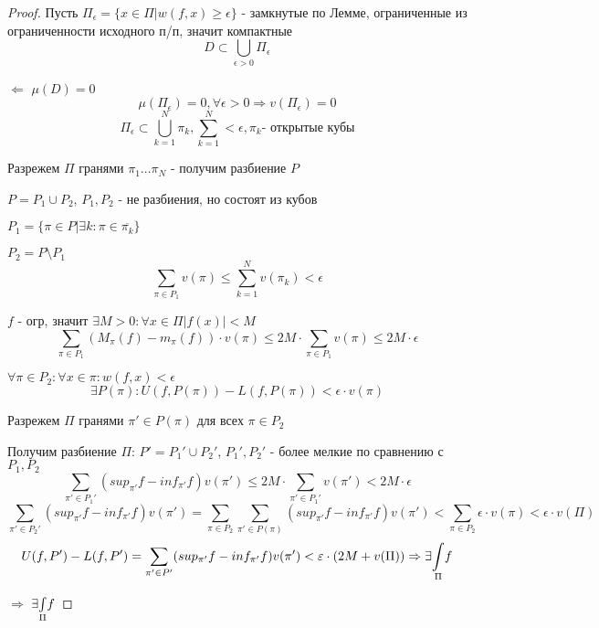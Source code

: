     \begin{proof}
        \par Пусть $\Pi_\epsilon = \{x \in \Pi | w(f,x) \ge \epsilon \}$ - замкнутые по Лемме, ограниченные из ограниченности исходного п/п, значит компактные
        $$D \subset \bigcup_{\epsilon > 0} \Pi_\epsilon$$
        \bigskip
        \par $\boxed{\Leftarrow}$ $\mu(D) = 0$ 
        $$\mu(\Pi_\epsilon) = 0, \forall \epsilon>0 \Rightarrow v(\Pi_\epsilon) = 0$$
        $$\Pi_\epsilon \subset \bigcup\limits_{k=1}^N \pi_k, \sum\limits_{k=1}^N < \epsilon, \pi_k \text {- открытые кубы}$$
        \par Разрежем $\Pi$ гранями $\pi_1 ... \pi_N$ - получим разбиение $P$
        \par $P = P_1 \cup P_2$, $P_1, P_2$ - не разбиения, но состоят из кубов
        \par $P_1 = \{\pi \in P | \exists k: \pi \in \overline{\pi_k} \}$
        \par $P_2 = P \setminus P_1$
        $$\sum\limits_{\pi \in P_1} v(\pi) \le \sum\limits_{k=1}^N v(\pi_k) < \epsilon$$
        \bigskip
        \par $f$ - огр, значит $\exists M>0: \forall x \in \Pi |f(x)| < M$
        $$\sum\limits_{\pi \in P_1} (M_\pi(f) - m_\pi(f)) \cdot v(\pi) \le 2M \cdot \sum\limits_{\pi \in P_1} v(\pi) \le 2M \cdot \epsilon$$
        \bigskip
        \par $\forall \pi \in P_2: \forall x\in \pi: w(f, x) < \epsilon$
        $$\exists P(\pi): U(f, P(\pi)) - L(f, P(\pi)) < \epsilon \cdot v(\pi)$$
        \par Разрежем $\Pi$ гранями $\pi' \in P(\pi)$ для всех $\pi \in P_2$
        \par Получим разбиение $\Pi$: $P' = P_1' \cup P_2'$, $P_1', P_2'$ - более мелкие по сравнению с $P_1, P_2$
        $$\sum\limits_{\pi' \in P_1'} (sup_{\pi'} f - inf_{\pi'} f)v(\pi') \le 2M \cdot \sum\limits_{\pi' \in P_1'} v(\pi') < 2M \cdot \epsilon$$
        \bigskip
        $$\sum\limits_{\pi' \in P_2'} (sup_{\pi'} f - inf_{\pi'} f)v(\pi') = \sum\limits_{\pi \in P_2} \sum\limits_{\pi' \in P(\pi)} (sup_{\pi'} f - inf_{\pi'} f)v(\pi') < \sum\limits_{\pi \in P_2} \epsilon \cdot v(\pi) < \epsilon \cdot v(\Pi)$$
        \bigskip
        $$U(f, P') - L(f, P') = \sum\limits_{\pi' \in P'} (sup_{\pi'} f - inf_{\pi'} f) v(\pi') < \varepsilon \cdot (2M + v(\Pi)) \Rightarrow \exists \underset{\Pi}{\int} f$$
        \bigskip
        \par $\boxed{\Rightarrow}$ $\exists \underset{\Pi}{\int} f$

\end{proof}
